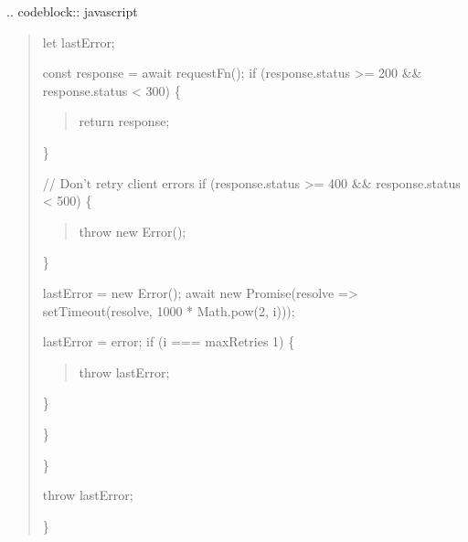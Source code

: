 \documentclass[letterpaper,10pt,english]{sphinxmanual}
\begin{document}
\sphinxAtStartPar
{}
.. code\sphinxhyphen{}block:: javascript
\begin{quote}
\begin{description}
\sphinxAtStartPar
let lastError;
\begin{description}
\begin{description}
\sphinxAtStartPar
const response = await requestFn();
if (response.status \textgreater{}= 200 \&\& response.status \textless{} 300) \{
\begin{quote}

\sphinxAtStartPar
return response;
\end{quote}

\sphinxAtStartPar
\}

\sphinxAtStartPar
// Don’t retry client errors
if (response.status \textgreater{}= 400 \&\& response.status \textless{} 500) \{
\begin{quote}

\sphinxAtStartPar
throw new Error();
\end{quote}

\sphinxAtStartPar
\}

\sphinxAtStartPar
lastError = new Error();
await new Promise(resolve =\textgreater{} setTimeout(resolve, 1000 * Math.pow(2, i)));

\sphinxAtStartPar
lastError = error;
if (i === maxRetries \sphinxhyphen{} 1) \{
\begin{quote}

\sphinxAtStartPar
throw lastError;
\end{quote}

\sphinxAtStartPar
\}

\end{description}

\sphinxAtStartPar
\}

\end{description}

\sphinxAtStartPar
\}

\sphinxAtStartPar
throw lastError;

\end{description}

\sphinxAtStartPar
\}
\end{quote}
\end{document}
